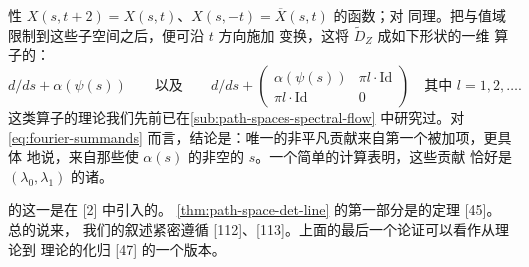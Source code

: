 \trPeriodic{}性 $X(s,t+2)=X(s,t)$、$X(s,-t)=\overline{X}(s,t)$ 的\trSmooth{}函数；对%
\trCokernel{}同理。把\trDomain{}与值域限制到这些子空间之后，便可沿 $t$ 方向施加%
\trFourier{}变换，这将 $\tilde{D}_Z$ \trSplitting{}成如下形状的一维%
\trDifferential{}算子的\trDirectSum：
\begin{equation}\label{eq:fourier-summands}
d/ds+\alpha(\psi(s))
\qquad\text{以及}\qquad
d/ds+\begin{pmatrix}\alpha(\psi(s)) & \pi l\cdot\mathrm{Id}\\ \pi l\cdot\mathrm{Id} & 0\end{pmatrix}
\quad\text{其中 } l=1,2,\ldots.
\end{equation}
这类算子的\trIndex{}理论我们先前已在\cref{sub:path-spaces-spectral-flow} 中研究过。对
\eqref{eq:fourier-summands} 而言，结论是：唯一的非平凡贡献来自第一个被加项，更具体
地说，来自那些使 $\alpha(s)$ 的\trNullSpace{}非空的 $s$。一个简单的计算表明，这些贡献
恰好是 $(\lambda_0,\lambda_1)$ 的诸\trCrossingForm。
\begin{remark}\label{thm:arnold-stratification-references}
\trLagrangianGrassmannian{}的这一\trStratum{}是在 [2] 中引入的。%
\cref{thm:path-space-det-line} 的第一部分是\trFloer{}的\trIndex{}定理 [45]。总的说来，
我们的叙述紧密遵循 [112]、[113]。上面的最后一个论证可以看作从\trFloer{}理论到%
\trMorse{}理论的化归 [47] 的一个\trLinear{}版本。
\end{remark}
